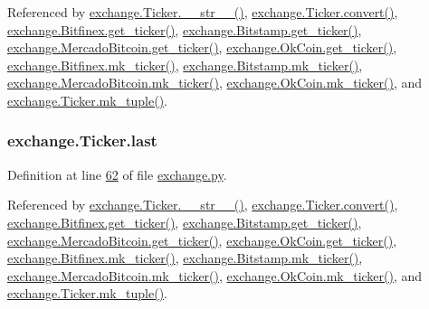 Referenced by \hyperlink{exchange_8py_source_l00111}{exchange.\+Ticker.\+\_\+\+\_\+str\+\_\+\+\_\+()}, \hyperlink{exchange_8py_source_l00065}{exchange.\+Ticker.\+convert()}, \hyperlink{exchange_8py_source_l00332}{exchange.\+Bitfinex.\+get\+\_\+ticker()}, \hyperlink{exchange_8py_source_l00401}{exchange.\+Bitstamp.\+get\+\_\+ticker()}, \hyperlink{exchange_8py_source_l00535}{exchange.\+Mercado\+Bitcoin.\+get\+\_\+ticker()}, \hyperlink{exchange_8py_source_l00600}{exchange.\+Ok\+Coin.\+get\+\_\+ticker()}, \hyperlink{exchange_8py_source_l00346}{exchange.\+Bitfinex.\+mk\+\_\+ticker()}, \hyperlink{exchange_8py_source_l00415}{exchange.\+Bitstamp.\+mk\+\_\+ticker()}, \hyperlink{exchange_8py_source_l00549}{exchange.\+Mercado\+Bitcoin.\+mk\+\_\+ticker()}, \hyperlink{exchange_8py_source_l00614}{exchange.\+Ok\+Coin.\+mk\+\_\+ticker()}, and \hyperlink{exchange_8py_source_l00096}{exchange.\+Ticker.\+mk\+\_\+tuple()}.

\subsubsection[{\texorpdfstring{last}{last}}]{\setlength{\rightskip}{0pt plus 5cm}exchange.\+Ticker.\+last}\hypertarget{classexchange_1_1_ticker_add7c2d95fa790dcdffddae2e584ce5f5}{}\label{classexchange_1_1_ticker_add7c2d95fa790dcdffddae2e584ce5f5}


Definition at line \hyperlink{exchange_8py_source_l00062}{62} of file \hyperlink{exchange_8py_source}{exchange.\+py}.



Referenced by \hyperlink{exchange_8py_source_l00111}{exchange.\+Ticker.\+\_\+\+\_\+str\+\_\+\+\_\+()}, \hyperlink{exchange_8py_source_l00065}{exchange.\+Ticker.\+convert()}, \hyperlink{exchange_8py_source_l00332}{exchange.\+Bitfinex.\+get\+\_\+ticker()}, \hyperlink{exchange_8py_source_l00401}{exchange.\+Bitstamp.\+get\+\_\+ticker()}, \hyperlink{exchange_8py_source_l00535}{exchange.\+Mercado\+Bitcoin.\+get\+\_\+ticker()}, \hyperlink{exchange_8py_source_l00600}{exchange.\+Ok\+Coin.\+get\+\_\+ticker()}, \hyperlink{exchange_8py_source_l00346}{exchange.\+Bitfinex.\+mk\+\_\+ticker()}, \hyperlink{exchange_8py_source_l00415}{exchange.\+Bitstamp.\+mk\+\_\+ticker()}, \hyperlink{exchange_8py_source_l00549}{exchange.\+Mercado\+Bitcoin.\+mk\+\_\+ticker()}, \hyperlink{exchange_8py_source_l00614}{exchange.\+Ok\+Coin.\+mk\+\_\+ticker()}, and \hyperlink{exchange_8py_source_l00096}{exchange.\+Ticker.\+mk\+\_\+tuple()}.

